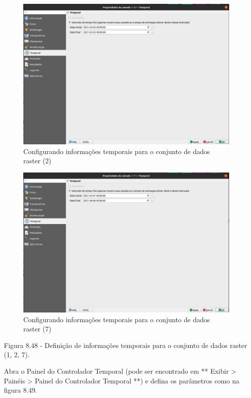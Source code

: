 \documentclass[
  portuguese,
]{krantz}
\begin{document}
\begin{figure}
\centering
\includegraphics{media/modulo8/fig848_b.png}
\caption{Configurando informações temporais para o conjunto de dados raster (2)}
\end{figure}

\begin{figure}
\centering
\includegraphics{media/modulo8/fig848_c.png}
\caption{Configurando informações temporais para o conjunto de dados raster (7)}
\end{figure}

Figura 8.48 - Definição de informações temporais para o conjunto de dados raster (1, 2, 7).

Abra o Painel do Controlador Temporal (pode ser encontrado em ** Exibir \textgreater{} Painéis \textgreater{} Painel do Controlador Temporal **) e defina os parâmetros como na figura 8.49.
\end{document}
